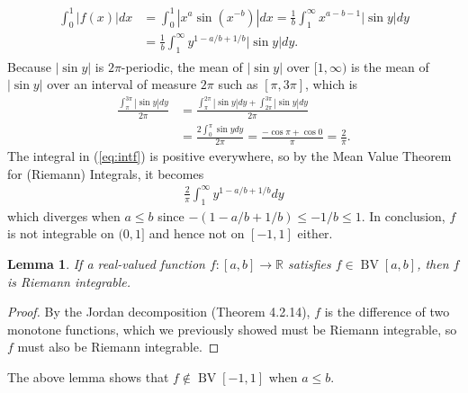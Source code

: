 \documentclass[a4paper,12pt]{article}
\DeclareMathOperator*{\BV}{BV}
\newtheorem{lemma}[theorem]{Lemma}
\begin{document}
\begin{enumerate}
\begin{enumerate}
\begin{align}
                \begin{split}
                    \int_0^1 |f(x)| dx &= \int_0^1 |x^a \sin(x^{-b})| dx = \frac{1}{b} \int_1^\infty x^{a - b - 1} |\sin y| dy \\
                    &= \frac{1}{b} \int_1^\infty y^{1 - a/b + 1/b} |\sin y| dy.
                \end{split}
            \end{align}
            Because $|\sin y|$ is $2\pi$-periodic, the mean of $|\sin y|$ over $[1, \infty)$ is the mean of $|\sin y|$ over an interval of measure $2\pi$ such as $[\pi, 3\pi]$, which is
            \begin{align*}
                \frac{\int_{\pi}^{3\pi} |\sin y| dy}{2\pi} &= \frac{\int_{\pi}^{2\pi} |\sin y| dy + \int_{2\pi}^{3\pi} |\sin y| dy}{2\pi} \\
                &= \frac{2\int_0^\pi \sin y dy}{2\pi} = \frac{-\cos\pi + \cos0}{\pi} = \frac{2}{\pi}.
            \end{align*}
            The integral in (\ref{eq:intf}) is positive everywhere, so by the Mean Value Theorem for (Riemann) Integrals, it becomes
            \begin{align*}
                \frac{2}{\pi} \int_1^\infty y^{1 - a/b + 1/b} dy
            \end{align*}
            which diverges when $a \leq b$ since $-(1 - a/b + 1/b) \leq -1/b \leq 1$. In conclusion, $f$ is not integrable on $(0, 1]$ and hence not on $[-1, 1]$ either.
            \begin{lemma}
                If a real-valued function $f : [a, b] \to \mathbb{R}$ satisfies $f \in \BV[a, b]$, then $f$ is Riemann integrable.
            \end{lemma}
            \begin{proof}
                By the Jordan decomposition (Theorem 4.2.14), $f$ is the difference of two monotone functions, which we previously showed must be Riemann integrable, so $f$ must also be Riemann integrable.
            \end{proof}
            The above lemma shows that $f \notin \BV[-1, 1]$ when $a \leq b$.


\end{enumerate}
\end{enumerate}
\end{document}
